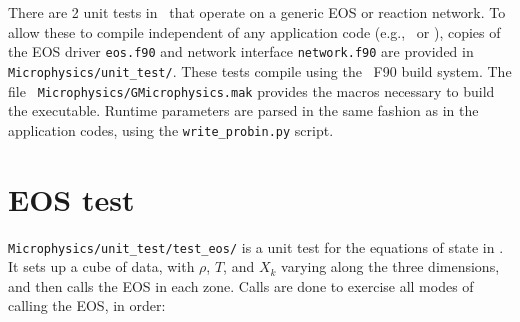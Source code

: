 \label{ch:unit_tests}

There are 2 unit tests in \microphysics\ that operate on a generic EOS
or reaction network.  To allow these to compile independent of any
application code (e.g., \maestro\ or \castro), copies of the EOS
driver {\tt eos.f90} and network interface {\tt network.f90} are
provided in {\tt Microphysics/unit\_test/}.  These tests compile using
the \boxlib\ F90 build system.  The file {\tt
  Microphysics/GMicrophysics.mak} provides the macros necessary to
build the executable.  Runtime parameters are parsed in the same
fashion as in the application codes, using the {\tt write\_probin.py}
script.

\section{EOS test}

{\tt Microphysics/unit\_test/test\_eos/} is a unit test for the
equations of state in \microphysics.  It sets up a cube of data, with
$\rho$, $T$, and $X_k$ varying along the three dimensions, and then
calls the EOS in each zone.  Calls are done to exercise all modes of
calling the EOS, in order:

